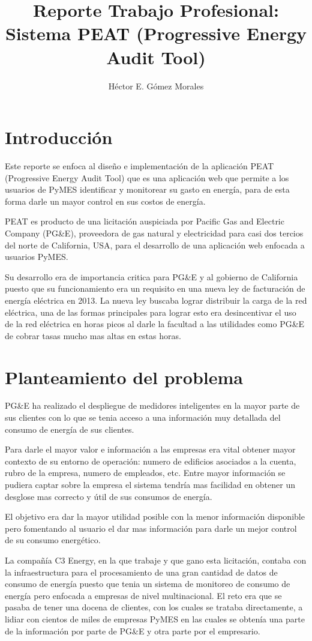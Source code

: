 \documentclass{article}
\author{Héctor E. Gómez Morales}
\title{Reporte Trabajo Profesional: Sistema PEAT (Progressive Energy
  Audit Tool)}
\begin{document}
\maketitle
\tableofcontents
\section{Introducción}
Este reporte se enfoca al diseño e implementación de la aplicación
PEAT (Progressive Energy Audit Tool) que es una aplicación web que
permite a los usuarios de PyMES identificar y monitorear su gasto en
energía, para de esta forma darle un mayor control en sus costos de
energía.

PEAT es producto de una licitación auspiciada por Pacific Gas and
Electric Company (PG\&E), proveedora de gas natural y electricidad
para casi dos tercios del norte de California, USA, para
el desarrollo de una aplicación web enfocada a usuarios PyMES.

Su desarrollo era de importancia critica para PG\&E y al gobierno de
California puesto que su funcionamiento era un requisito en una nueva
ley de facturación de energía eléctrica en 2013. La nueva ley buscaba
lograr distribuir la carga de la red eléctrica, una de las formas
principales para lograr esto era desincentivar el uso de la red
eléctrica en horas picos al darle la facultad a las utilidades como PG\&E
de cobrar tasas mucho mas altas en estas horas.

\section{Planteamiento del problema}
PG\&E ha realizado el despliegue de medidores inteligentes en la
mayor parte de sus clientes con lo que se tenia acceso a una información
muy detallada del consumo de energía de sus clientes.

Para darle el mayor valor e información a las empresas era
vital obtener mayor contexto de su entorno de operación: numero
de edificios asociados a la cuenta, rubro de la empresa, numero de
empleados, etc. Entre mayor información se pudiera captar sobre la
empresa el sistema tendría mas facilidad en obtener un desglose
mas correcto y útil de sus consumos de energía.

El objetivo era dar la mayor utilidad posible con la menor
información disponible pero fomentando al usuario el dar mas
información para darle un mejor control de su consumo energético.

La compañía C3 Energy, en la que trabaje y que gano esta licitación,
contaba con la infraestructura para el procesamiento de una gran
cantidad de datos de consumo de energía puesto que tenia un sistema
de monitoreo de consumo de energía pero enfocada a empresas de nivel
multinacional. El reto era que se pasaba de tener una docena
de clientes, con los cuales se trataba directamente, a lidiar con
cientos de miles de empresas PyMES en las cuales se obtenía una
parte de la información por parte de PG\&E y otra parte por el
empresario.
\end{document}

